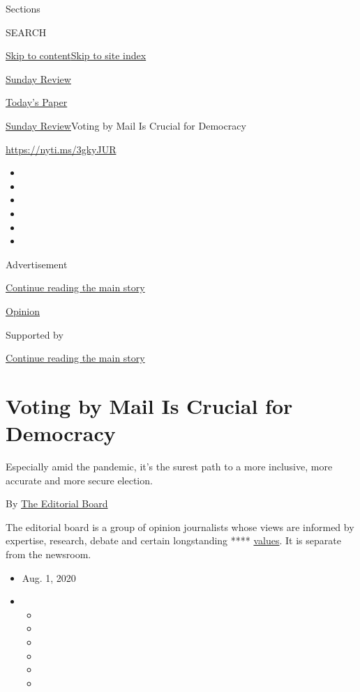 Sections

SEARCH

\protect\hyperlink{site-content}{Skip to
content}\protect\hyperlink{site-index}{Skip to site index}

\href{https://www.nytimes.com/section/opinion/sunday}{Sunday Review}

\href{https://myaccount.nytimes.com/auth/login?response_type=cookie\&client_id=vi}{}

\href{https://www.nytimes.com/section/todayspaper}{Today's Paper}

\href{/section/opinion/sunday}{Sunday Review}\textbar{}Voting by Mail Is
Crucial for Democracy

\url{https://nyti.ms/3gkyJUR}

\begin{itemize}
\item
\item
\item
\item
\item
\item
\end{itemize}

Advertisement

\protect\hyperlink{after-top}{Continue reading the main story}

\href{/section/opinion}{Opinion}

Supported by

\protect\hyperlink{after-sponsor}{Continue reading the main story}

\hypertarget{voting-by-mail-is-crucial-for-democracy}{%
\section{Voting by Mail Is Crucial for
Democracy}\label{voting-by-mail-is-crucial-for-democracy}}

Especially amid the pandemic, it's the surest path to a more inclusive,
more accurate and more secure election.

By
\href{https://www.nytimes.com/interactive/opinion/editorialboard.html}{The
Editorial Board}

The editorial board is a group of opinion journalists whose views are
informed by expertise, research, debate and certain longstanding ****
\href{https://www.nytimes.com/interactive/2018/opinion/editorialboard.html}{values}.
It is separate from the newsroom.

\begin{itemize}
\item
  Aug. 1, 2020
\item
  \begin{itemize}
  \item
  \item
  \item
  \item
  \item
  \item
  \end{itemize}
\end{itemize}

